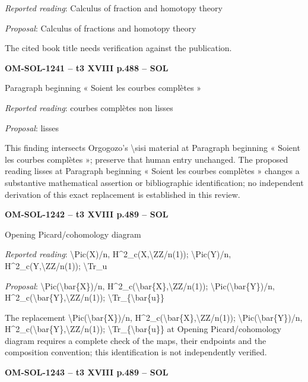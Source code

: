 \emph{Reported reading}: Calculus of fraction and homotopy theory\par
\emph{Proposal}: Calculus of fractions and homotopy theory\par
The cited book title needs verification against the publication.\par
\par\noindent\textbf{OM-SOL-1241 -- t3 XVIII p.488 -- SOL}\par
Paragraph beginning « Soient les courbes complètes »\par
\emph{Reported reading}: courbes complètes non lisses\par
\emph{Proposal}: lisses\par
This finding intersects Orgogozo's \textbackslash{}sisi material at Paragraph beginning « Soient les courbes complètes »; preserve that human entry unchanged. The proposed reading lisses at Paragraph beginning « Soient les courbes complètes » changes a substantive mathematical assertion or bibliographic identification; no independent derivation of this exact replacement is established in this review.\par
\par\noindent\textbf{OM-SOL-1242 -- t3 XVIII p.489 -- SOL}\par
Opening Picard/cohomology diagram\par
\emph{Reported reading}: \textbackslash{}Pic(X)/n, H\textasciicircum{}2\_c(X,\textbackslash{}ZZ/n(1)); \textbackslash{}Pic(Y)/n, H\textasciicircum{}2\_c(Y,\textbackslash{}ZZ/n(1)); \textbackslash{}Tr\_u\par
\emph{Proposal}: \textbackslash{}Pic(\textbackslash{}bar\{X\})/n, H\textasciicircum{}2\_c(\textbackslash{}bar\{X\},\textbackslash{}ZZ/n(1)); \textbackslash{}Pic(\textbackslash{}bar\{Y\})/n, H\textasciicircum{}2\_c(\textbackslash{}bar\{Y\},\textbackslash{}ZZ/n(1)); \textbackslash{}Tr\_\{\textbackslash{}bar\{u\}\}\par
The replacement \textbackslash{}Pic(\textbackslash{}bar\{X\})/n, H\textasciicircum{}2\_c(\textbackslash{}bar\{X\},\textbackslash{}ZZ/n(1)); \textbackslash{}Pic(\textbackslash{}bar\{Y\})/n, H\textasciicircum{}2\_c(\textbackslash{}bar\{Y\},\textbackslash{}ZZ/n(1)); \textbackslash{}Tr\_\{\textbackslash{}bar\{u\}\} at Opening Picard/cohomology diagram requires a complete check of the maps, their endpoints and the composition convention; this identification is not independently verified.\par
\par\noindent\textbf{OM-SOL-1243 -- t3 XVIII p.489 -- SOL}\par
